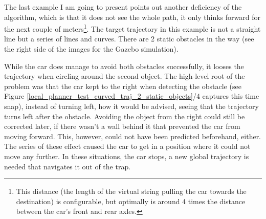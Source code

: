 The last example I am going to present points out another deficiency of the algorithm, which is that it does not see the whole path, it only thinks forward for the next couple of meters\footnote{This distance (the length of the virtual string pulling the car towards the destination) is configurable, but optimally is around 4 times the distance between the car's front and rear axles.}. The target trajectory in this example is not a straight line but a series of lines and curves. There are 2 static obstacles in the way (see the right side of the images for the Gazebo simulation).

While the car does manage to avoid both obstacles successfully, it looses the trajectory when circling around the second object. The high-level root of the problem was that the car kept to the right when detecting the obstacle (see Figure \ref{local_planner_test_curved_traj_2_static_objects}/4 captures this time snap), instead of turning left, how it would be advised, seeing that the trajectory turns left after the obstacle. Avoiding the object from the right could still be corrected later, if there wasn't a wall behind it that prevented the car from moving forward. This, however, could not have been predicted beforehand, either. The series of these effect caused the car to get in a position where it could not move any further. In these situations, the car stops, a new global trajectory is needed that navigates it out of the trap.

